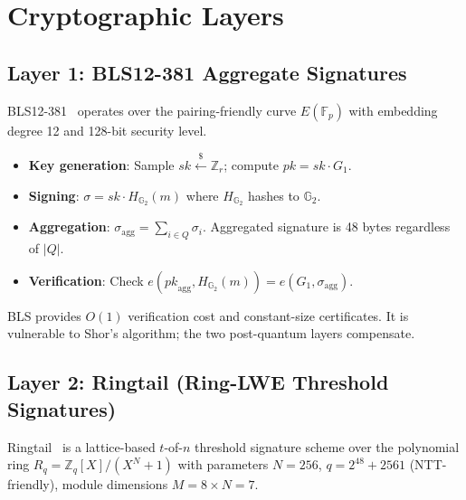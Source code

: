 \documentclass[11pt,a4paper]{article}
\begin{document}
\section{Cryptographic Layers}
\label{sec:crypto}

\subsection{Layer 1: BLS12-381 Aggregate Signatures}

BLS12-381~\cite{boneh2001short} operates over the pairing-friendly curve
$E(\mathbb{F}_p)$ with embedding degree 12 and 128-bit security level.

\begin{itemize}[leftmargin=2em]
\item \textbf{Key generation}: Sample $\mathit{sk} \xleftarrow{\$}
      \mathbb{Z}_r$; compute $\mathit{pk} = \mathit{sk} \cdot G_1$.
\item \textbf{Signing}: $\sigma = \mathit{sk} \cdot H_{\mathbb{G}_2}(m)$
      where $H_{\mathbb{G}_2}$ hashes to $\mathbb{G}_2$.
\item \textbf{Aggregation}: $\sigma_{\mathrm{agg}} = \sum_{i \in Q}
      \sigma_i$. Aggregated signature is 48 bytes regardless of $|Q|$.
\item \textbf{Verification}: Check $e(\mathit{pk}_{\mathrm{agg}},
      H_{\mathbb{G}_2}(m)) = e(G_1, \sigma_{\mathrm{agg}})$.
\end{itemize}

BLS provides $O(1)$ verification cost and constant-size certificates.
It is vulnerable to Shor's algorithm; the two post-quantum layers compensate.

\subsection{Layer 2: Ringtail (Ring-LWE Threshold Signatures)}

Ringtail~\cite{ringtail} is a lattice-based $t$-of-$n$ threshold signature
scheme over the polynomial ring $R_q = \mathbb{Z}_q[X]/(X^N + 1)$ with
parameters $N = 256$, $q = 2^{48} + 2561$ (NTT-friendly), module dimensions
$M = 8 \times N = 7$.
\end{document}
